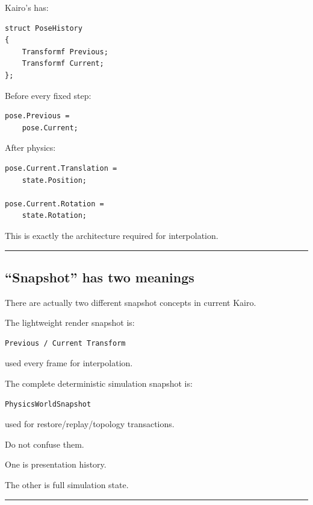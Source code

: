 Kairo's  has:

\begin{verbatim}
struct PoseHistory
{
    Transformf Previous;
    Transformf Current;
};
\end{verbatim}

Before every fixed step:

\begin{verbatim}
pose.Previous =
    pose.Current;
\end{verbatim}

After physics:

\begin{verbatim}
pose.Current.Translation =
    state.Position;

pose.Current.Rotation =
    state.Rotation;
\end{verbatim}

This is exactly the architecture required for interpolation.

\begin{center}\rule{0.5\linewidth}{0.5pt}\end{center}

\subsection{``Snapshot'' has two meanings}\label{06-engine-ii-ch037-snapshot-has-two-meanings}

\hypertarget{06-engine-ii-ch037-snapshot-has-two-meanings}{}

There are actually two different snapshot concepts in current Kairo.

The lightweight render snapshot is:

\begin{verbatim}
Previous / Current Transform
\end{verbatim}

used every frame for interpolation.

The complete deterministic simulation snapshot is:

\begin{verbatim}
PhysicsWorldSnapshot
\end{verbatim}

used for restore/replay/topology transactions.

Do not confuse them.

One is presentation history.

The other is full simulation state.

\begin{center}\rule{0.5\linewidth}{0.5pt}\end{center}


